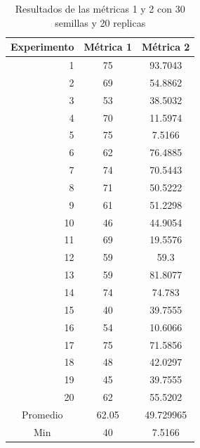 \documentclass{article}
\begin{document}
\begin{center}
\begin{table}[htbp]
	\centering
	\caption{Resultados  de las métricas 1 y 2 con 30 semillas  y 20 replicas}
	\begin{tabular}{|c|c|c|}
		\hline
		Experimento  & \multicolumn{1}{l|}{Métrica 1} & \multicolumn{1}{l|}{Métrica 2} \\
		\hline
		\multicolumn{1}{|r|}{1} & 75    & 93.7043 \\
		\hline
		\multicolumn{1}{|r|}{2} & 69    & 54.8862 \\
		\hline
		\multicolumn{1}{|r|}{3} & 53    & 38.5032 \\
		\hline
		\multicolumn{1}{|r|}{4} & 70    & 11.5974 \\
		\hline
		\multicolumn{1}{|r|}{5} & 75    & \cellcolor[rgb]{ .663,  .816,  .557}7.5166 \\
		\hline
		\multicolumn{1}{|r|}{6} & 62    & 76.4885 \\
		\hline
		\multicolumn{1}{|r|}{7} & 74    & 70.5443 \\
		\hline
		\multicolumn{1}{|r|}{8} & 71    & 50.5222 \\
		\hline
		\multicolumn{1}{|r|}{9} & 61    & 51.2298 \\
		\hline
		\multicolumn{1}{|r|}{10} & 46    & 44.9054 \\
		\hline
		\multicolumn{1}{|r|}{11} & 69    & 19.5576 \\
		\hline
		\multicolumn{1}{|r|}{12} & 59    & 59.3 \\
		\hline
		\multicolumn{1}{|r|}{13} & 59    & 81.8077 \\
		\hline
		\multicolumn{1}{|r|}{14} & 74    & 74.783 \\
		\hline
		\multicolumn{1}{|r|}{15} & \cellcolor[rgb]{ .663,  .816,  .557}40 & 39.7555 \\
		\hline
		\multicolumn{1}{|r|}{16} & 54    & 10.6066 \\
		\hline
		\multicolumn{1}{|r|}{17} & 75    & 71.5856 \\
		\hline
		\multicolumn{1}{|r|}{18} & 48    & 42.0297 \\
		\hline
		\multicolumn{1}{|r|}{19} & 45    & 39.7555 \\
		\hline
		\multicolumn{1}{|r|}{20} & 62    & 55.5202 \\
		\hline
		Promedio & 62.05 & 49.729965 \\
		\hline
		Min   & 40    & 7.5166 \\
		\hline
	\end{tabular}%
	\label{tab:addlabel}%
\end{table}%



\end{center}
\end{document}
